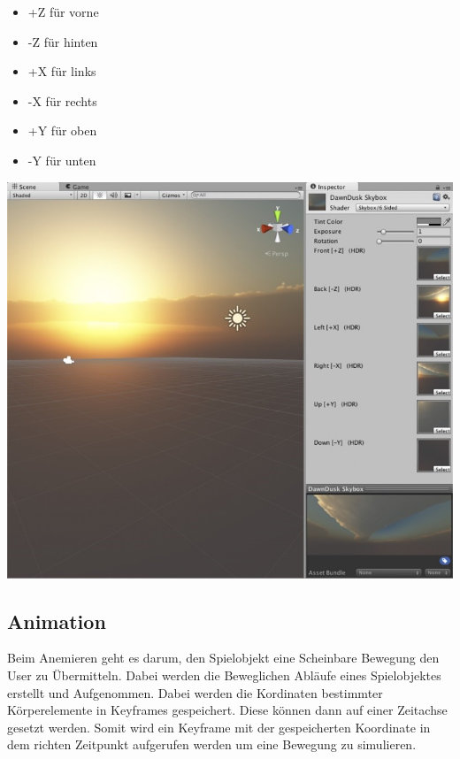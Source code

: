 \begin{minipage}{0.4\textwidth}
    \begin{itemize}
        \item +Z für vorne 
        \item -Z für hinten 
        \item +X für links 
        \item -X für rechts
        \item +Y für oben
        \item -Y für unten
    \end{itemize}
  \end{minipage}
  \hfill
  \begin{minipage}{0.6\textwidth}
    \includegraphics[width=\linewidth]{chapters/14/Images/Skybox.png}
  \end{minipage}

\pagebreak
\subsection{Animation}

Beim Anemieren geht es darum, den Spielobjekt eine Scheinbare Bewegung den User zu Übermitteln. Dabei werden die Beweglichen Abläufe eines Spielobjektes erstellt und Aufgenommen. Dabei werden die Kordinaten bestimmter Körperelemente in Keyframes gespeichert. Diese können dann auf einer Zeitachse gesetzt werden. Somit wird ein Keyframe mit der gespeicherten Koordinate in dem richten Zeitpunkt aufgerufen werden um eine Bewegung zu simulieren. 